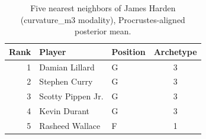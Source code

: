 \begin{table}[htbp]
  \centering\small
  \begin{tabular}{rllc}
    \toprule
    Rank & Player & Position & Archetype \\
    \midrule
    1 & Damian Lillard & G & 3 \\
    2 & Stephen Curry & G & 3 \\
    3 & Scotty Pippen Jr. & G & 3 \\
    4 & Kevin Durant & G & 3 \\
    5 & Rasheed Wallace & F & 1 \\
    \bottomrule
  \end{tabular}
  \caption{Five nearest neighbors of James Harden (curvature_m3 modality), Procrustes-aligned posterior mean.}
  \label{tab:James_Harden_neighbors_curvature_m3}
\end{table}

